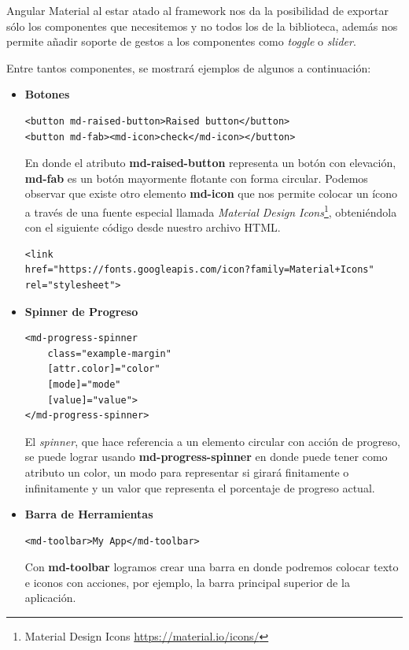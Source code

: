 Angular Material al estar atado al framework nos da la posibilidad de exportar sólo los componentes que necesitemos y no todos los de la biblioteca, además nos permite añadir soporte de gestos a los componentes como \textit{toggle} o \textit{slider}.

Entre tantos componentes, se mostrará ejemplos de algunos a continuación:

\begin{itemize}
\item\textbf{Botones}
\begin{verbatim}
<button md-raised-button>Raised button</button>
<button md-fab><md-icon>check</md-icon></button>
\end{verbatim}
En donde el atributo \textbf{md-raised-button} representa un botón con elevación, \textbf{md-fab} es un botón mayormente flotante con forma circular. Podemos observar que existe otro elemento \textbf{md-icon} que nos permite colocar un ícono a través de una fuente especial llamada \textit{Material Design Icons}\footnote{Material Design Icons \url{https://material.io/icons/}}, obteniéndola con el siguiente código desde nuestro archivo HTML.
\begin{verbatim}
<link
href="https://fonts.googleapis.com/icon?family=Material+Icons"
rel="stylesheet">
\end{verbatim}

\item\textbf{Spinner de Progreso}
\begin{verbatim}
<md-progress-spinner
    class="example-margin"
    [attr.color]="color"
    [mode]="mode"
    [value]="value">
</md-progress-spinner>
\end{verbatim}
El \textit{spinner}, que hace referencia a un elemento circular con acción de progreso, se puede lograr usando \textbf{md-progress-spinner} en donde puede tener como atributo un color, un modo para representar si girará finitamente o infinitamente y un valor que representa el porcentaje de progreso actual.

\item\textbf{Barra de Herramientas}
\begin{verbatim}
<md-toolbar>My App</md-toolbar>
\end{verbatim}
Con \textbf{md-toolbar} logramos crear una barra en donde podremos colocar texto e iconos con acciones, por ejemplo, la barra principal superior de la aplicación.
\end{itemize}


